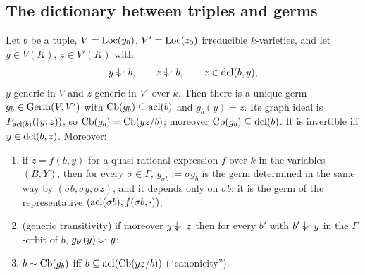 \subsection{The dictionary between triples and germs}

\begin{lemma}\label{lem:triple}
Let $b$ be a tuple, $V=\operatorname{Loc}(y_0)$, $V'=\operatorname{Loc}(z_0)$ irreducible $k$-varieties, and let
$y\in V(K)$, $z\in V'(K)$ with
\[
   y\ind{}b,\qquad z\ind{}b,\qquad z\in\dcl(b,y),
\]
$y$ generic in $V$ and $z$ generic in $V'$ over $k$.  Then there is a unique germ
$g_b\in\operatorname{Germ}(V,V')$ with $\operatorname{Cb}(g_b)\subseteq\operatorname{acl}(b)$ and $g_b(y)=z$.  Its graph ideal is
$P_{\operatorname{acl}(b)}((y,z))$, so $\operatorname{Cb}(g_b)=\operatorname{Cb}(yz/b)$; moreover $\operatorname{Cb}(g_b)\subseteq\operatorname{dcl}(b)$.  It is
invertible iff $y\in\operatorname{dcl}(b,z)$.  Moreover:
\begin{enumerate}[nosep]
\item if $z=f(b,y)$ for a quasi-rational expression $f$ over $k$ in the variables $(B,Y)$,
  then for every $\sigma\in\Gamma$, $g_{\sigma b}:=\sigma g_b$ is the germ determined in
  the same way by $(\sigma b,\sigma y,\sigma z)$, and it depends only on $\sigma b$: it is
  the germ of the representative $(\operatorname{acl}(\sigma b),f(\sigma b,\cdot))$;
\item (generic transitivity) if moreover $y\ind{}z$ then for every $b'$ with
  $b'\ind{}y$ in the $\Gamma$-orbit of $b$, $g_{b'}(y)\ind{}y$;
\item $b\sim\operatorname{Cb}(g_b)$ iff $b\subseteq\operatorname{acl}(\operatorname{Cb}(yz/b))$ (``canonicity'').
\end{enumerate}
\end{lemma}
